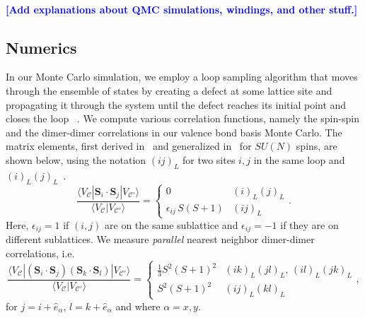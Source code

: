 \documentclass[11pt]{iopart}
\begin{document}
\paragraph{}
\textcolor{blue}{\bf [Add explanations about QMC simulations, windings, and other stuff.]}

%

\subsection{Numerics}

In our Monte Carlo simulation, we employ a loop sampling algorithm that moves through the ensemble of states by creating a defect at some lattice site and propagating it through the system until the defect reaches its initial point and closes the loop ~\cite{sandvik2010loop}. We compute various correlation functions, namely the spin-spin and the dimer-dimer correlations in our valence bond basis Monte Carlo. The matrix elements, first derived in~\cite{beach2006some} and generalized in~\cite{beach2009n} for $SU(N)$ spins, are shown below, using the notation $(ij)_L$ for two sites $i,j$ in the same loop and $(i)_L(j)_L$~\cite{RVB2}.
\[ 
\displaystyle
\frac{\langle V_\mathcal{C} | \mathbf{S}_i \cdot \mathbf{S}_j | V_{\mathcal{C}'} \rangle}{\langle V_\mathcal{C} | V_{\mathcal{C}'} \rangle} = \left\{ \begin{array}{ccc}
0 & (i)_L (j)_L\\
\epsilon_{ij} \, S (S+1) & (ij)_L   \end{array}. \right.
\] 
Here, $\epsilon_{ij} = 1$ if $(i,j)$ are on the same sublattice and $\epsilon_{ij} = -1$ if they are on different sublattices.
We measure \textit{parallel} nearest neighbor dimer-dimer correlations, i.e.
\[ 
\displaystyle
\frac{\langle V_\mathcal{C} | \left( \mathbf{S}_i \cdot \mathbf{S}_j \right) \left( \mathbf{S}_k \cdot \mathbf{S}_l  \right) | V_{\mathcal{C}'} \rangle}{\langle V_\mathcal{C} | V_{\mathcal{C}'} \rangle} = \left\{ \begin{array}{ccc}
\frac{1}{3} S^2 (S+1)^2 & (ik)_L (jl)_L, \,(il)_L (jk)_L\\
S^2 (S+1)^2 & (ij)_L (kl)_L \end{array}, \right.
\] 
for $j = i + \hat{e}_\alpha, \, l = k + \hat{e}_\alpha$ and where $\alpha = x, y$.

\end{document}

